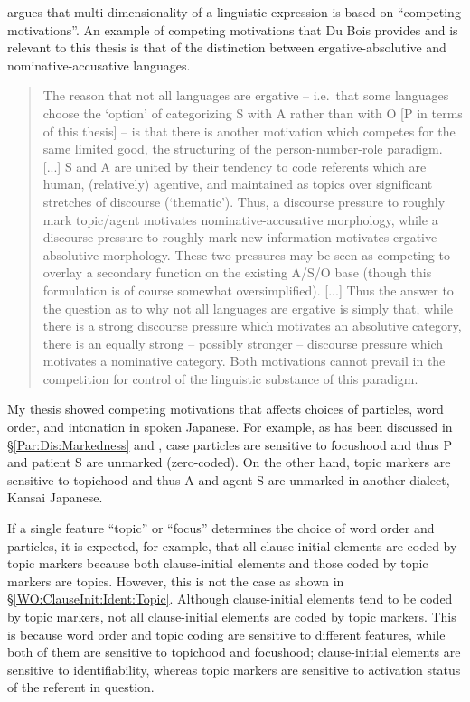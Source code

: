  argues that multi-dimensionality of a linguistic expression is based on ``competing motivations''.
An example of competing motivations that Du Bois provides and is relevant to this thesis is
that of the distinction between ergative-absolutive and nominative-accusative languages.
%
\begin{quote}
The reason that not all languages are ergative -- i.e.~that some languages choose the `option' of categorizing S with A rather than with O [P in terms of this thesis] -- 
is that there is another motivation which competes for the same limited good,
the structuring of the person-number-role paradigm. [...]
S and A are united by their tendency to code referents which are human,
(relatively) agentive, and maintained as topics over significant stretches of discourse (`thematic').
Thus, a discourse pressure to roughly mark topic/agent motivates nominative-accusative morphology,
while a discourse pressure to roughly mark new information motivates ergative-absolutive morphology.
These two pressures may be seen as competing to overlay a secondary function on the existing A/S/O base (though this formulation is of course somewhat oversimplified). [...]
Thus the answer to the question as to why not all languages are ergative is simply that,
while there is a strong discourse pressure which motivates an absolutive category, there is an equally strong -- possibly stronger --
discourse pressure which motivates a nominative category.
Both motivations cannot prevail in the competition for control of the linguistic substance of this paradigm.
\cite[354--355]{dubois85}
\end{quote}
%
My thesis showed competing motivations that affects
choices of particles, word order, and intonation in spoken Japanese.
For example,
as has been discussed in \S \ref{Par:Dis:Markedness} and ,
case particles are sensitive to focushood and thus
P and patient S are unmarked (zero-coded).
On the other hand, topic markers are sensitive to topichood and thus
A and agent S are unmarked in another dialect, Kansai Japanese.

If a single feature ``topic'' or ``focus'' determines the choice of word order and particles,
it is expected, for example, that
all clause-initial elements are coded by topic markers
because both clause-initial elements and those coded by topic markers are topics.
However, this is not the case
as shown in \S \ref{WO:ClauseInit:Ident:Topic}.
Although clause-initial elements tend to be coded by topic markers,
not all clause-initial elements are coded by topic markers.
This is because word order and topic coding are sensitive to different features, while both of them are sensitive to topichood and focushood; clause-initial elements are sensitive to identifiability,
whereas topic markers are sensitive to activation status of the referent in question.

